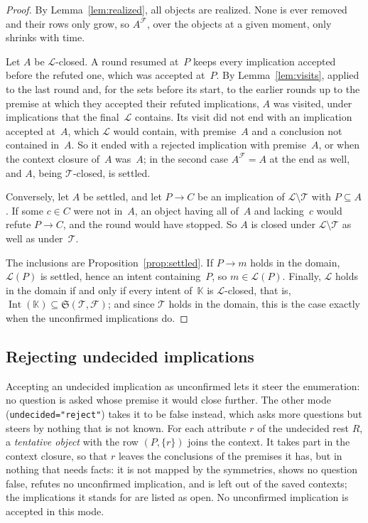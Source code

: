 \documentclass[11pt,a4paper]{article}
\theoremstyle{definition}
\theoremstyle{remark}
\newcommand{\code}[1]{\texttt{#1}}
\newcommand{\cl}{\mathcal{L}}
\newcommand{\Int}{\operatorname{Int}}
\begin{document}
\begin{proof}
By Lemma~\ref{lem:realized}, all objects are realized. None is ever removed and their rows only grow, so $A^{\mathcal{F}}$, over the objects at a given moment, only shrinks with time.

Let $A$ be $\cl$-closed. A round resumed at~$P$ keeps every implication accepted before the refuted one, which was accepted at~$P$. By Lemma~\ref{lem:visits}, applied to the last round and, for the sets before its start, to the earlier rounds up to the premise at which they accepted their refuted implications, $A$ was visited, under implications that the final~$\cl$ contains. Its visit did not end with an implication accepted at~$A$, which $\cl$ would contain, with premise~$A$ and a conclusion not contained in~$A$. So it ended with a rejected implication with premise~$A$, or when the context closure of~$A$ was~$A$; in the second case $A^{\mathcal{F}} = A$ at the end as well, and $A$, being $\mathcal{T}$-closed, is settled.

Conversely, let $A$ be settled, and let $P \to C$ be an implication of $\cl \setminus \mathcal{T}$ with $P \subseteq A$. If some $c \in C$ were not in~$A$, an object having all of~$A$ and lacking~$c$ would refute $P \to C$, and the round would have stopped. So $A$ is closed under $\cl \setminus \mathcal{T}$ as well as under~$\mathcal{T}$.

The inclusions are Proposition~\ref{prop:settled}. If $P \to m$ holds in the domain, $\cl(P)$ is settled, hence an intent containing~$P$, so $m \in \cl(P)$. Finally, $\cl$ holds in the domain if and only if every intent of~$\mathbb{K}$ is $\cl$-closed, that is, $\Int(\mathbb{K}) \subseteq \mathfrak{S}(\mathcal{T}, \mathcal{F})$; and since $\mathcal{T}$ holds in the domain, this is the case exactly when the unconfirmed implications do.
\end{proof}

\subsection{Rejecting undecided implications}\label{sec:reject}

Accepting an undecided implication as unconfirmed lets it steer the enumeration: no question is asked whose premise it would close further. The other mode (\code{undecided="reject"}) takes it to be false instead, which asks more questions but steers by nothing that is not known. For each attribute $r$ of the undecided rest $R$, a \emph{tentative object} with the row $(P, \{r\})$ joins the context. It takes part in the context closure, so that $r$ leaves the conclusions of the premises it has, but in nothing that needs facts: it is not mapped by the symmetries, shows no question false, refutes no unconfirmed implication, and is left out of the saved contexts; the implications it stands for are listed as open. No unconfirmed implication is accepted in this mode.
\end{document}
